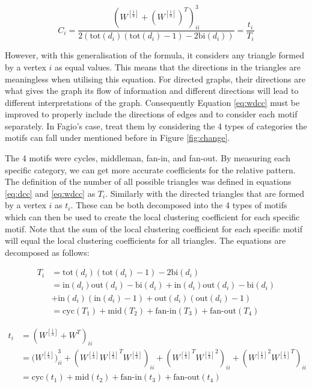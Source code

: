 \begin{equation} \label{eq:wdcc}
C_i = \frac{(W^{[\frac{1}{3}]} + (W^{[\frac{1}{3}]})^T)^3_{ii}}{2(\text{tot}(d_i)(\text{tot}(d_i) - 1) - 2\text{bi}(d_i))} = \frac{t_i}{T_i}
\end{equation}

However, with this generalisation of the formula, it considers any triangle formed by a vertex $i$ as equal values. This means that the directions in the triangles are meaningless when utilising this equation. For directed graphs, their directions are what gives the graph its flow of information and different directions will lead to different interpretations of the graph. Consequently Equation \ref{eq:wdcc} must be improved to properly include the directions of edges and to consider each motif separately. In Fagio's case, treat them by considering the 4 types of categories the motifs can fall under mentioned before in Figure \ref{fig:change}. 

The 4 motifs were cycles, middleman, fan-in, and fan-out. By measuring each specific category, we can get more accurate coefficients for the relative pattern. The definition of the number of all possible triangles was defined in equations \ref{eq:dcc} and \ref{eq:wdcc} as $T_i$. Similarly with the directed triangles that are formed by a vertex $i$ as $t_i$. These can be both decomposed into the 4 types of motifs which can then be used to create the local clustering coefficient for each specific motif. Note that the sum of the local clustering coefficient for each specific motif will equal the local clustering coefficients for all triangles. The equations are decomposed as follows:

\begin{align}
T_i &= \text{tot}(d_i)(\text{tot}(d_i) - 1) - 2\text{bi}(d_i) \\
&= \text{in}(d_i)\text{out}(d_i) - \text{bi}(d_i) + \text{in}(d_i)\text{out}(d_i) - \text{bi}(d_i) \nonumber \\
&+ \text{in}(d_i)(\text{in}(d_i) - 1) + \text{out}(d_i)(\text{out}(d_i) - 1) \nonumber \\ 
&= \text{cyc}(T_1) + \text{mid}(T_2) + \text{fan-in}(T_3) + \text{fan-out}(T_4) \nonumber
\end{align}

\begin{align}
t_i &= (W^{[\frac{1}{3}]} + W^T)_{ii} \\
&= ({W^{[\frac{1}{3}]})}^3_{ii} + (W^{[\frac{1}{3}]}{W^{[\frac{1}{3}]}}^TW^{[\frac{1}{3}]})_{ii} + ({W^{[\frac{1}{3}]}}^T{W^{[\frac{1}{3}]}}^2)_{ii} + ({W^{[\frac{1}{3}]}}^2{W^{[\frac{1}{3}]}}^T)_{ii} \nonumber \\ 
&= \text{cyc}(t_1) + \text{mid}(t_2) + \text{fan-in}(t_3) + \text{fan-out}(t_4) \nonumber
\end{align}
 
